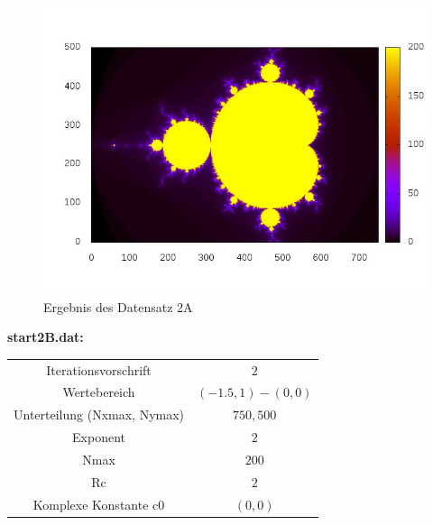 \documentclass{report}
\begin{document}
\begin{figure}[h]
    \includegraphics[scale=0.7]{ergebnis2A}
    \caption{Ergebnis des Datensatz 2A}
    \label{fig:ergebnis2A} %
\end{figure}

\clearpage{}
\textbf{start2B.dat:}

\begin{center}
\begin{tabular}{c|c}
Iterationsvorschrift & $2$ \\
\cline{1-2}
Wertebereich & $(-1.5, 1) - (0, 0)$ \\
\cline{1-2}
Unterteilung (Nxmax, Nymax) & $750, 500$ \\
\cline{1-2}
Exponent & $2$  \\
\cline{1-2}
Nmax & $200$ \\
\cline{1-2}
Rc & $2$ \\
\cline{1-2}
Komplexe Konstante c0 & $(0, 0)$ \\
\cline{1-2}
\end{tabular}
\label{tab:resA2_4}
\end{center}
\end{document}
